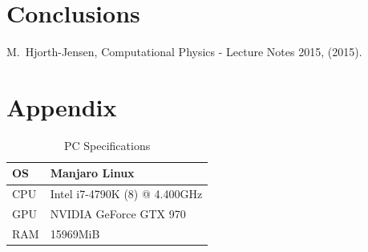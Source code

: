 \documentclass[10pt,showpacs,preprintnumbers,footinbib,amsmath,amssymb,aps,prl,twocolumn,groupedaddress,superscriptaddress,showkeys]{revtex4-1}
\begin{document}

\section{Conclusions}

\begin{thebibliography}{99}
 M.~Hjorth-Jensen, Computational Physics - Lecture Notes 2015, (2015).
\end{thebibliography}

\newpage

\appendix
  \section{Appendix}
  \begin{table}[h]
  \caption{PC Specifications}
  \begin{tabular}{|l|l|}
    \hline
    OS & Manjaro Linux \\ \hline
    CPU & Intel i7-4790K (8) @ 4.400GHz \\ \hline
    GPU & NVIDIA GeForce GTX 970  \\ \hline
    RAM & 15969MiB \\ \hline
  \end{tabular}
  \label{tab:specs}
  \end{table}
\end{document}
